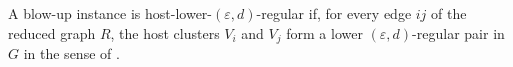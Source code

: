 \begin{definition}
A blow-up instance  is host-lower-$(\varepsilon,d)$-regular if, for every edge $ij$ of the reduced graph $R$, the host clusters $V_i$ and $V_j$ form a lower $(\varepsilon,d)$-regular pair in $G$ in the sense of .
\end{definition}
